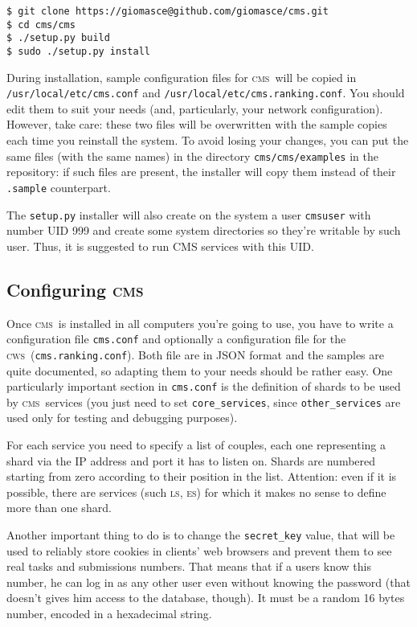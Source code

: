 \documentclass[a4paper,8pt]{amsart}
\newcommand{\CMS}{\textsc{cms}}
\newcommand{\LS}{\textsc{ls}}
\newcommand{\ES}{\textsc{es}}
\newcommand{\CWS}{\textsc{cws}}
\newcommand{\id}[1]{\texttt{#1}}
\newcommand{\file}[1]{\texttt{#1}}
\begin{document}
\begin{multicols}{2}
\begin{verbatim}
$ git clone https://giomasce@github.com/giomasce/cms.git
$ cd cms/cms
$ ./setup.py build
$ sudo ./setup.py install
\end{verbatim}

  During installation, sample configuration files for \CMS\ will be
  copied in \file{/usr/local/etc/cms.conf} and
  \file{/usr/local/etc/cms.ranking.conf}. You should edit them to suit
  your needs (and, particularly, your network configuration). However,
  take care: these two files will be overwritten with the sample
  copies each time you reinstall the system. To avoid losing your
  changes, you can put the same files (with the same names) in the
  directory \file{cms/cms/examples} in the repository: if such files
  are present, the installer will copy them instead of their
  \file{.sample} counterpart.

  The \file{setup.py} installer will also create on the system a user
  \id{cmsuser} with number UID 999 and create some system directories
  so they're writable by such user. Thus, it is suggested to run CMS
  services with this UID.

  \subsection{Configuring \CMS}

  Once \CMS\ is installed in all computers you're going to use, you
  have to write a configuration file \file{cms.conf} and optionally a
  configuration file for the \CWS\ (\file{cms.ranking.conf}). Both
  file are in JSON format and the samples are quite documented, so
  adapting them to your needs should be rather easy. One particularly
  important section in \file{cms.conf} is the definition of shards to
  be used by \CMS\ services (you just need to set \id{core\_services},
  since \id{other\_services} are used only for testing and debugging
  purposes).

  For each service you need to specify a list of couples, each one
  representing a shard via the IP address and port it has to listen
  on. Shards are numbered starting from zero according to their
  position in the list. Attention: even if it is possible, there are
  services (such \LS, \ES) for which it makes no sense to define more
  than one shard.

  Another important thing to do is to change the \id{secret\_key}
  value, that will be used to reliably store cookies in clients' web
  browsers and prevent them to see real tasks and submissions
  numbers. That means that if a users know this number, he can log in
  as any other user even without knowing the password (that doesn't
  gives him access to the database, though). It must be a random 16
  bytes number, encoded in a hexadecimal string.


\end{multicols}
\end{document}
